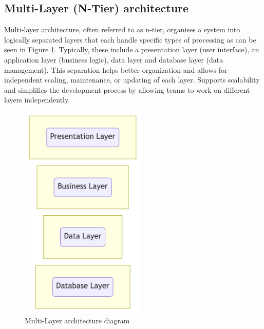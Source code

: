 \subsection{Multi-Layer (N-Tier) architecture}
Multi-layer architecture, often referred to as n-tier, organises a system into logically separated layers that each handle specific types of processing as can be seen in Figure \ref{img03:multi_layer_architecture_diagram}. 
Typically, these include a presentation layer (user interface), an application layer (business logic), data layer and database layer (data management). 
This separation helps better organization and allows for independent scaling, maintenance, or updating of each layer. 
Supports scalability and simplifies the development process by allowing teams to work on different layers independently.
\begin{figure}[H]\centering
\includegraphics[width=60mm]{img/chap03/fig_multi_layer_architecture_mermaid.png}
\caption{Multi-Layer architecture diagram}
\label{img03:multi_layer_architecture_diagram}
\end{figure}






